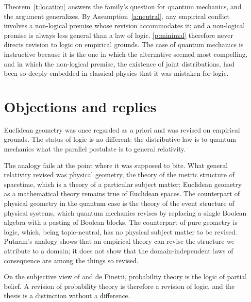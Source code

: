 \documentclass{situationist-preprint}
\begin{document}
Theorem~\ref{t:location} answers the family's question for quantum mechanics, and the argument generalizes. By Assumption~\ref{a:neutral}, any empirical conflict involves a non-logical premise whose revision accommodates it; and a non-logical premise is always less general than a law of logic. \ref{p:minimal} therefore never directs revision to logic on empirical grounds. The case of quantum mechanics is instructive because it is the one in which the alternative seemed most compelling, and in which the non-logical premise, the existence of joint distributions, had been so deeply embedded in classical physics that it was mistaken for logic.

\section{Objections and replies}

\begin{objection}
Euclidean geometry was once regarded as a priori and was revised on empirical grounds. The status of logic is no different: the distributive law is to quantum mechanics what the parallel postulate is to general relativity.
\end{objection}

\begin{reply}
The analogy fails at the point where it was supposed to bite. What general relativity revised was physical geometry, the theory of the metric structure of spacetime, which is a theory of a particular subject matter; Euclidean geometry as a mathematical theory remains true of Euclidean spaces. The counterpart of physical geometry in the quantum case is the theory of the event structure of physical systems, which quantum mechanics revises by replacing a single Boolean algebra with a pasting of Boolean blocks. The counterpart of pure geometry is logic, which, being topic-neutral, has no physical subject matter to be revised. Putnam's analogy shows that an empirical theory can revise the structure we attribute to a domain; it does not show that the domain-independent laws of consequence are among the things so revised.
\end{reply}

\begin{objection}
On the subjective view of \citet{Ramsey1926} and de Finetti, probability theory is the logic of partial belief. A revision of probability theory is therefore a revision of logic, and the thesis is a distinction without a difference.
\end{objection}
\end{document}
